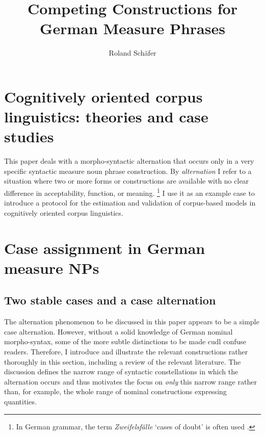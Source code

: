 \documentclass[USenglish]{article}
\begin{document}

  \author*[1]{Roland Schäfer}
  \title{Competing Constructions for German Measure Phrases}


  
\maketitle

\section{Cognitively oriented corpus linguistics: theories and case studies}
\label{sec:cogocl}

This paper deals with a morpho-syntactic alternation that occurs only in a very specific syntactic measure noun phrase construction.
By \textit{alternation} I refer to a situation where two or more forms or constructions are available with no clear difference in acceptability, function, or meaning.%
\footnote{In German grammar, the term \textit{Zweifelsfälle} `cases of doubt' is often used \citep{Klein2009}.}
I use it as an example case to introduce a protocol for the estimation and validation of corpus-based models in cognitively oriented corpus linguistics.


\section{Case assignment in German measure NPs}
\label{sec:germanmeasurenps}

\subsection{Two stable cases and a case alternation}

The alternation phenomenon to be discussed in this paper appears to be a simple case alternation.
However, without a solid knowledge of German nominal morpho-syntax, some of the more subtle distinctions to be made cudl confuse readers.
Therefore, I introduce and illustrate the relevant constructions rather thoroughly in this section, including a review of the relevant literature.
The discussion defines the narrow range of syntactic constellations in which the alternation occurs and thus motivates the focus on \textit{only} this narrow range rather than, for example, the whole range of nominal constructions expressing quantities.
\end{document}
